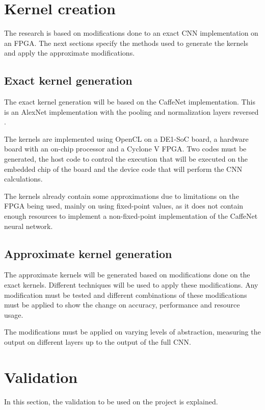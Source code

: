 \section{Kernel creation}

The research is based on modifications done to an exact CNN implementation on an FPGA. 
The next sections specify the methods used to generate the kernels and apply the 
approximate modifications.

\subsection{Exact kernel generation}

The exact kernel generation will be based on the CaffeNet implementation. This is an AlexNet implementation
with the pooling and normalization layers reversed \cite{donahue2012bvlc}. 

The kernels are implemented using OpenCL on a DE1-SoC board, a hardware board with an on-chip processor and
a Cyclone V FPGA. Two codes must be generated, the host code to control the execution that will be executed on
the embedded chip of the board and the device code that will perform the CNN calculations.

The kernels already contain some approximations due to limitations on the FPGA being used, mainly on using
fixed-point values, as it does
not contain enough resources to implement a non-fixed-point implementation of the CaffeNet neural network.

\subsection{Approximate kernel generation}

The approximate kernels will be generated based on modifications done on the exact kernels.
Different techniques will be used to apply these modifications. Any modification must be tested
and different combinations of these modifications must be applied to show the change on accuracy,
performance and resource usage.

The modifications must be applied on varying levels of abstraction, measuring the output on different
layers up to the output of the full CNN.

\section{Validation}

In this section, the validation to be used on the project is explained.


